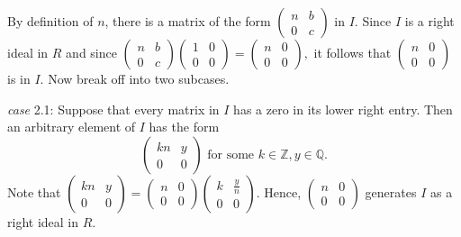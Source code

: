 \documentclass[12pt]{article}
\begin{document}
By definition of $n$, there is a matrix of the form
\(
\begin{pmatrix}
n & b\\
0 & c
\end{pmatrix}
\)
in $I$. Since $I$ is a right ideal in $R$ and since
\(
\begin{pmatrix}
n & b\\
0 & c
\end{pmatrix}
\begin{pmatrix}
1 & 0\\
0 & 0
\end{pmatrix}
=
\begin{pmatrix}
n & 0\\
0 & 0
\end{pmatrix},
\)
it follows that 
\(
\begin{pmatrix}
n & 0\\
0 & 0
\end{pmatrix}
\)
is in $I$. Now break off into two subcases.

\emph{case} 2.1: Suppose that every matrix in $I$ has a zero in its lower right entry. Then 
an arbitrary element of $I$ has the form
\[
\begin{pmatrix}
kn & y\\
0 & 0
\end{pmatrix}
\text{ for some }k\in\mathbb{Z}, y\in\mathbb{Q}.
\]
Note that 
\(
\begin{pmatrix}
kn & y\\
0 & 0
\end{pmatrix}
=
\begin{pmatrix}
n & 0\\
0 & 0
\end{pmatrix}
\begin{pmatrix}
k & \frac{y}{n}\\
0 & 0
\end{pmatrix}
\). Hence, 
\(
\begin{pmatrix}
n & 0\\
0 & 0
\end{pmatrix}
\) generates $I$ as a right ideal in $R$.
\end{document}
